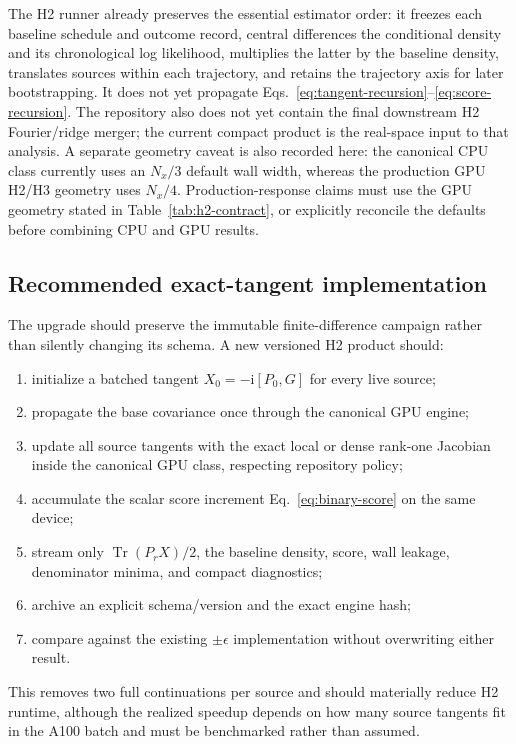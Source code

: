 \documentclass[aps,prb,onecolumn,nofootinbib,superscriptaddress]{revtex4-2}
\newcommand{\Tr}{\operatorname{Tr}}
\newcommand{\ii}{\mathrm{i}}
\begin{document}
The H2 runner already preserves the essential estimator order: it freezes each
baseline schedule and outcome record, central differences the conditional
density and its chronological log likelihood, multiplies the latter by the
baseline density, translates sources within each trajectory, and retains the
trajectory axis for later bootstrapping.  It does not yet propagate
Eqs.~\eqref{eq:tangent-recursion}--\eqref{eq:score-recursion}.  The repository
also does not yet contain the final downstream H2 Fourier/ridge merger; the
current compact product is the real-space input to that analysis.  A separate
geometry caveat is also recorded here: the canonical CPU class currently uses
an $N_x/3$ default wall width, whereas the production GPU H2/H3 geometry uses
$N_x/4$.  Production-response claims must use the GPU geometry stated in
Table~\ref{tab:h2-contract}, or explicitly reconcile the defaults before
combining CPU and GPU results.

\subsection{Recommended exact-tangent implementation}

The upgrade should preserve the immutable finite-difference campaign rather
than silently changing its schema.  A new versioned H2 product should:
\begin{enumerate}
  \item initialize a batched tangent $X_0=-\ii[P_0,G]$ for every live source;
  \item propagate the base covariance once through the canonical GPU engine;
  \item update all source tangents with the exact local or dense rank-one
  Jacobian inside the canonical GPU class, respecting repository policy;
  \item accumulate the scalar score increment
  Eq.~\eqref{eq:binary-score} on the same device;
  \item stream only $\Tr(P_rX)/2$, the baseline density, score, wall leakage,
  denominator minima, and compact diagnostics;
  \item archive an explicit schema/version and the exact engine hash;
  \item compare against the existing $\pm\epsilon$ implementation without
  overwriting either result.
\end{enumerate}
This removes two full continuations per source and should materially reduce H2
runtime, although the realized speedup depends on how many source tangents fit
in the A100 batch and must be benchmarked rather than assumed.
\end{document}
